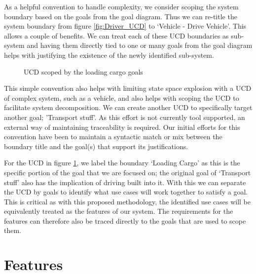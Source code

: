 As a helpful convention to handle complexity, we consider scoping the system boundary based on the goals from the goal diagram. Thus we can re-title the system boundary from figure \ref{fig:Driver_UCD} to `Vehicle - Drive Vehicle'. This allows a couple of benefits. We can treat each of these \ac{UCD} boundaries as sub-system and having them directly tied to one or many goals from the goal diagram helps with justifying the existence of the newly identified sub-system.

\begin{figure}
	\centering
	
	\caption{\ac{UCD} scoped by the loading cargo goals}
	\label{fig:Cargo_UCD}
\end{figure}

This simple convention also helps with limiting state space explosion with a \ac{UCD} of complex system, such as a vehicle, and also helps with scoping the \ac{UCD} to facilitate system decomposition. We can create another \ac{UCD} to specifically target another goal; 'Transport stuff'. As this effort is not currently tool supported, an external way of maintaining traceability is required. Our initial efforts for this convention have been to maintain a syntactic match or mix between the boundary title and the goal(s) that support its justifications.

For the \ac{UCD} in figure \ref{fig:Cargo_UCD}, we label the boundary `Loading Cargo' as this is the specific portion of the goal that we are focused on; the original goal of `Transport stuff' also has the implication of driving built into it. With this we can separate the \ac{UCD} by goals to identify what use cases will work together to satisfy a goal. This is critical as with this proposed methodology, the identified use cases will be equivalently treated as the features of our system. The requirements for the features can therefore also be traced directly to the goals that are used to scope them. 

\section{Features}

